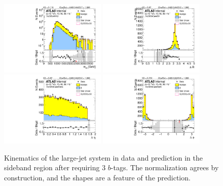 \begin{figure}[htbp!]
\begin{center}
\includegraphics[width=0.45\textwidth,angle=-90]{figures/boosted/Sideband/b77_ThreeTag_Sideband_mHH_l_1.pdf}
\includegraphics[width=0.45\textwidth,angle=-90]{figures/boosted/Sideband/b77_ThreeTag_Sideband_hCandDr.pdf}\\
\includegraphics[width=0.45\textwidth,angle=-90]{figures/boosted/Sideband/b77_ThreeTag_Sideband_hCandDeta.pdf}
\includegraphics[width=0.45\textwidth,angle=-90]{figures/boosted/Sideband/b77_ThreeTag_Sideband_hCandDphi.pdf}
  \caption{Kinematics of the large-\R jet system in data and prediction in the sideband region after requiring 3 $b$-tags. The normalization agrees by construction, and the shapes are a feature of the prediction. }
  \label{fig:boosted-3b-sideband-ak10-system}
\end{center}
\end{figure}

